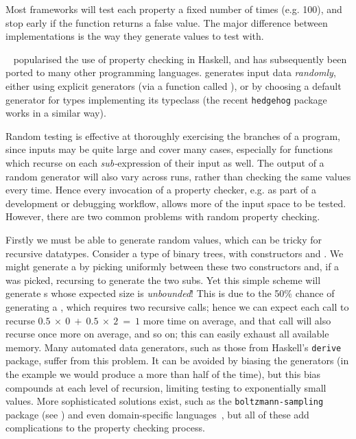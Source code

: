Most frameworks will test each property a fixed number of times (e.g. 100), and
stop early if the function returns a false value. The major difference between
implementations is the way they generate values to test with.

\quickcheck{}~\cite{claessen2011quickcheck} popularised the use of
property checking in Haskell, and has subsequently been ported to many other
programming languages. \quickcheck{} generates input data \emph{randomly},
either using explicit generators (via a function called ), or by
choosing a default generator for types implementing its 
typeclass (the recent \texttt{hedgehog} package works in a similar way).

Random testing is effective at thoroughly exercising the branches of a program,
since inputs may be quite large and cover many cases, especially for functions
which recurse on each \emph{sub-}expression of their input as well. The output
of a random generator will also vary across runs, rather than checking the same
values every time. Hence every invocation of a property checker, e.g. as part of
a development or debugging workflow, allows more of the input space to be
tested. However, there are two common problems with random property checking.

Firstly we must be able to generate random values, which can be tricky for
recursive datatypes. Consider a type of binary trees, with constructors
 and . We might
generate a  by picking uniformly between these two constructors
and, if a  was picked, recursing to generate the two
subs. Yet this simple scheme will generate s whose
expected size is \emph{unbounded}! This is due to the 50\% chance of generating
a , which requires two recursive calls; hence we can expect each
call to recurse $0.5~\times~0~+~0.5~\times~2~=~1$ more time on average, and that call will also
recurse once more on average, and so on; this can easily exhaust all available
memory. Many automated data generators, such as those from Haskell's
\texttt{derive} package, suffer from this problem. It can be avoided by biasing
the generators (in the  example we would produce a 
more than half of the time), but this bias compounds at each level of recursion,
limiting testing to exponentially small values. More sophisticated solutions
exist, such as the \texttt{boltzmann-sampling} package (see
\cite{duchon2004boltzmann}) and even domain-specific
languages~\cite{lampropoulos2017beginner}, but all of these add complications to
the property checking process.

